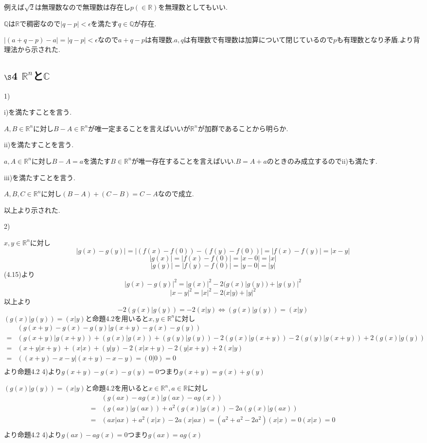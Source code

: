 \documentclass{jsarticle}
\begin{document}
例えば$\sqrt{2}$は無理数なので無理数は存在し$p(\in \mathbb{R})$を無理数としてもいい.

$\mathbb{Q}$は$\mathbb{R}$で稠密なので$|q-p|<\epsilon$を満たす$q\in\mathbb{Q}$が存在.

$|(a+q-p)-a|=|q-p|<\epsilon$なので$a+q-p$は有理数.$a,q$は有理数で有理数は加算について閉じているので$p$も有理数となり矛盾.より背理法から示された.
\subsection*{$\S$4 $\mathbb{R}^n$と$\mathbb{C}$}
1)

i)を満たすことを言う.

$A,B\in\mathbb{R}^n$に対し$B-A\in \mathbb{R}^n$が唯一定まることを言えばいいが$\mathbb{R}^n$が加群であることから明らか.

ii)を満たすことを言う.

$a,A\in\mathbb{R}^n$に対し$B-A=a$を満たす$B\in\mathbb{R}^n$が唯一存在することを言えばいい.$B=A+a$のときのみ成立するのでii)も満たす.

iii)を満たすことを言う.

$A,B,C\in\mathbb{R}^n$に対し$(B-A)+(C-B)=C-A$なので成立.

以上より示された.

2)

$x,y\in\mathbb{R}^n$に対し
\[|g(x)-g(y)|=|(f(x)-f(0))-(f(y)-f(0))|=|f(x)-f(y)|=|x-y|\]
\[|g(x)|=|f(x)-f(0)|=|x-0|=|x|\]
\[|g(y)|=|f(y)-f(0)|=|y-0|=|y|\]
(4.15)より
\[|g(x)-g(y)|^2=|g(x)|^2-2(g(x)|g(y))+|g(y)|^2\]
\[|x-y|^2=|x|^2-2(x|y)+|y|^2\]
以上より
\[-2(g(x)|g(y))=-2(x|y)\Leftrightarrow (g(x)|g(y))=(x|y)\]
$(g(x)|g(y))=(x|y)$と命題4.2を用いると$x,y\in\mathbb{R}^n$に対し
\begin{align*}
& (g(x+y)-g(x)-g(y)|g(x+y)-g(x)-g(y))\\
=& (g(x+y)|g(x+y))+(g(x)|g(x))+(g(y)|g(y))-2(g(x)|g(x+y))-2(g(y)|g(x+y))+2(g(x)|g(y))\\
=& (x+y|x+y)+(x|x)+(y|y)-2(x|x+y)-2(y|x+y)+2(x|y)\\
=& ((x+y)-x-y|(x+y)-x-y)=(0|0)=0\\
\end{align*}
より命題4.2 4)より$g(x+y)-g(x)-g(y)=0$つまり$g(x+y)=g(x)+g(y)$

$(g(x)|g(y))=(x|y)$と命題4.2を用いると$x\in\mathbb{R}^n,a\in\mathbb{R}$に対し
\begin{align*}
& (g(ax)-ag(x)|g(ax)-ag(x))\\
=& (g(ax)|g(ax))+a^2(g(x)|g(x))-2a(g(x)|g(ax))\\
=& (ax|ax)+a^2(x|x)-2a(x|ax) = (a^2+a^2-2a^2)(x|x)=0(x|x) =0\\
\end{align*}
より命題4.2 4)より$g(ax)-ag(x)=0$つまり$g(ax)=ag(x)$
\end{document}
